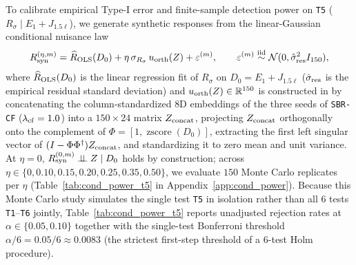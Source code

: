 \documentclass[preprint,11pt,a4paper]{elsarticle}
\newcommand{\R}{\mathbb{R}}
\begin{document}
To calibrate empirical Type-I error and finite-sample detection power on \texttt{T5} ($R_\sigma\mid E_1+J_{1.5\ell}$), we generate synthetic responses from the linear-Gaussian conditional nuisance law
\begin{equation}
R_{\rm syn}^{(\eta,m)} = \widehat R_{\rm OLS}(D_0) + \eta\,\sigma_{R_\sigma}\,u_{\rm orth}(Z) + \varepsilon^{(m)},
\qquad
\varepsilon^{(m)}\stackrel{\rm iid}{\sim}\mathcal N(0,\hat\sigma_{\rm res}^2 I_{150}),
\label{eq:syn_cond_power}
\end{equation}
where $\widehat R_{\rm OLS}(D_0)$ is the linear regression fit of $R_\sigma$ on $D_0=E_1+J_{1.5\ell}$ ($\hat\sigma_{\rm res}$ is the empirical residual standard deviation) and $u_{\rm orth}(Z)\in\R^{150}$ is constructed in  by concatenating the column-standardized 8D embeddings of the three seeds of \texttt{SBR-CF} ($\lambda_{\rm cf}=1.0$) into a $150\times 24$ matrix $Z_{\rm concat}$, projecting $Z_{\rm concat}$ orthogonally onto the complement of $\Phi=[1,\operatorname{zscore}(D_0)]$, extracting the first left singular vector of $(I-\Phi\Phi^\dagger)Z_{\rm concat}$, and standardizing it to zero mean and unit variance. At $\eta=0$, $R_{\rm syn}^{(0,m)}\perp\!\!\!\perp Z\mid D_0$ holds by construction; across $\eta\in\{0, 0.10, 0.15, 0.20, 0.25, 0.35, 0.50\}$, we evaluate $150$ Monte Carlo replicates per $\eta$ (Table~\ref{tab:cond_power_t5} in Appendix~\ref{app:cond_power}). Because this Monte Carlo study simulates the single test \texttt{T5} in isolation rather than all 6 tests \texttt{T1}--\texttt{T6} jointly, Table~\ref{tab:cond_power_t5} reports unadjusted rejection rates at $\alpha\in\{0.05,0.10\}$ together with the single-test Bonferroni threshold $\alpha/6=0.05/6\approx 0.0083$ (the strictest first-step threshold of a 6-test Holm procedure).
\end{document}
